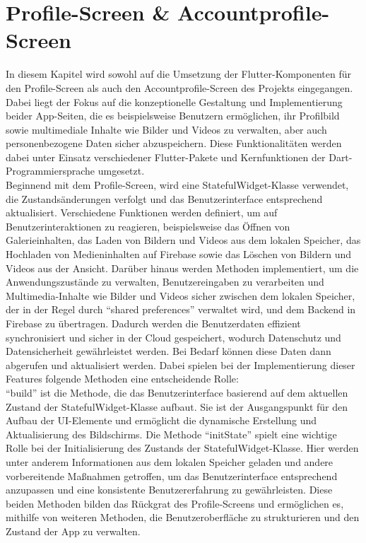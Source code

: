 \chapter{Profile-Screen \& Accountprofile-Screen}
In diesem Kapitel wird sowohl auf die Umsetzung der Flutter-Komponenten für den Profile-Screen als auch den Accountprofile-Screen des Projekts eingegangen.
Dabei liegt der Fokus auf die konzeptionelle Gestaltung und Implementierung beider App-Seiten, die es beispielsweise Benutzern ermöglichen, ihr Profilbild sowie multimediale Inhalte wie Bilder und Videos zu verwalten, aber auch personenbezogene Daten sicher abzuspeichern. 
Diese Funktionalitäten werden dabei unter Einsatz verschiedener Flutter-Pakete und Kernfunktionen der Dart-Programmiersprache umgesetzt. 
\\
Beginnend mit dem Profile-Screen, wird eine StatefulWidget-Klasse verwendet, die Zustandsänderungen verfolgt und das Benutzerinterface entsprechend aktualisiert.
Verschiedene Funktionen werden definiert, um auf Benutzerinteraktionen zu reagieren, beispielsweise das Öffnen von Galerieinhalten, das Laden von Bildern und Videos aus dem lokalen Speicher, das Hochladen von Medieninhalten auf Firebase sowie das Löschen von Bildern und Videos aus der Ansicht.
Darüber hinaus werden Methoden implementiert, um die Anwendungszustände zu verwalten, Benutzereingaben zu verarbeiten und Multimedia-Inhalte wie Bilder und Videos sicher zwischen dem lokalen Speicher, der in der Regel durch ``shared preferences'' verwaltet wird, und dem Backend in Firebase zu übertragen. 
Dadurch werden die Benutzerdaten effizient synchronisiert und sicher in der Cloud gespeichert, wodurch Datenschutz und Datensicherheit gewährleistet werden. 
Bei Bedarf können diese Daten dann abgerufen und aktualisiert werden. Dabei spielen bei der Implementierung dieser Features folgende Methoden eine entscheidende Rolle:
\\``build'' ist die Methode, die das Benutzerinterface basierend auf dem aktuellen Zustand der StatefulWidget-Klasse aufbaut. Sie ist der Ausgangspunkt für den Aufbau der UI-Elemente und ermöglicht die dynamische Erstellung und Aktualisierung des Bildschirms. 
Die Methode ``initState'' spielt eine wichtige Rolle bei der Initialisierung des Zustands der StatefulWidget-Klasse. Hier werden unter anderem Informationen aus dem lokalen Speicher geladen und andere vorbereitende Maßnahmen getroffen, um das Benutzerinterface entsprechend anzupassen und eine konsistente Benutzererfahrung zu gewährleisten. 
Diese beiden Methoden bilden das Rückgrat des Profile-Screens und ermöglichen es, mithilfe von weiteren Methoden, die Benutzeroberfläche zu strukturieren und den Zustand der App zu verwalten.
